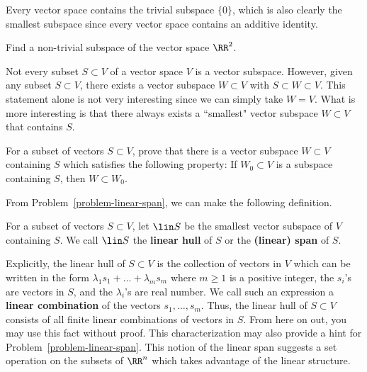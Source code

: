 \documentclass[11pt]{article}
\begin{document}
Every vector space contains the trivial subspace $\{0\}$, which is also clearly the smallest subspace since every vector space contains an additive identity. 

\begin{prob}[5 points]
    Find a non-trivial subspace of the vector space $\RR^2$. 
\end{prob}

Not every subset $S \subset V$ of a vector space $V$ is a vector subspace. However, given any subset $S \subset V$, there exists a vector subspace $W \subset V$ with $S \subset W \subset V$. This statement alone is not very interesting since we can simply take $W = V$. What is more interesting is that there always exists a ``smallest" vector subspace $W \subset V$ that contains $S$. 

\begin{prob} [10 points]\label{problem-linear-span}
    For a subset of vectors $S \subset V$, prove that there is a vector subspace $W \subset V$ containing $S$ which satisfies the following property: If $W_0 \subset V$ is a subspace containing $S$, then $W \subset W_0$. 
\end{prob}

From Problem~\ref{problem-linear-span}, we can make the following definition. 

\begin{defn} \label{definition-linear-span}
    For a subset of vectors $S \subset V$, let $\lin S$ be the smallest vector subspace of $V$ containing $S$. We call $\lin S$ the \textbf{linear hull} of $S$ or the \textbf{(linear) span} of $S$. 
\end{defn}

Explicitly, the linear hull of $S \subset V$ is the collection of vectors in $V$ which can be written in the form $\lambda_1 s_1 + \ldots + \lambda_m s_m$ where $m \geq 1$ is a positive integer, the $s_i$'s are vectors in $S$, and the $\lambda_i$'s are real number. We call such an expression a \textbf{linear combination} of the vectors $s_1, \ldots, s_m$. Thus, the linear hull of $S \subset V$ consists of all finite linear combinations of vectors in $S$. From here on out, you may use this fact without proof. This characterization may also provide a hint for Problem~\ref{problem-linear-span}. This notion of the linear span suggests a set operation on the subsets of $\RR^n$ which takes advantage of the linear structure. 
\end{document}

